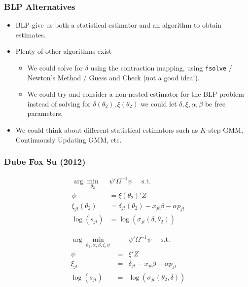 \documentclass[aspectratio=169,10pt]{beamer}
\begin{document}
 \begin{frame}
\frametitle{BLP Alternatives}
\begin{itemize}
 \item BLP give us both a statistical \alert{estimator} and an \alert{algorithm} to obtain estimates.
\item Plenty of other algorithms exist
\begin{itemize}
\item We could solve for $\delta$ using the contraction mapping, using \texttt{fsolve} / Newton's Method / Guess and Check (not a good idea!).
\item We could try and consider a non-nested estimator for the BLP problem instead of solving for $\delta(\theta_2),\xi(\theta_2)$ we could let $\delta,\xi,\alpha,\beta$ be free parameters.
 \end{itemize}
\item We could think about different statistical estimators such as $K$-step GMM, Continuously Updating GMM, etc.
 \end{itemize}
\end{frame}


 \begin{frame}\frametitle{Dube Fox Su (2012)}
\footnotesize
\begin{align}
\label{blpnfxp}
\nonumber \arg \min_{\theta_2} & \psi' \Omega^{-1} \psi \quad \mbox{ s.t. } \\
\nonumber \psi &= \xi(\theta_2)' Z\\
\xi_{jt}(\theta_2) &= \delta_{jt}(\theta_2) - x_{jt} \beta - \alpha p_{jt} \\
\nonumber \log(s_{jt})  &= \log(\sigma_{jt}(\delta,\theta_2))
\end{align}

\begin{eqnarray}
\label{blpmpec}
\nonumber \arg \min_{\theta_2,\alpha,\beta, \xi,\psi} && \psi' \Omega^{-1}  \psi \quad \mbox{ s.t. } \\
 \psi &=& \xi' Z\\
\nonumber \xi_{jt} &=& \delta_{jt} - x_{jt} \beta - \alpha p_{jt} \\
\nonumber \log(s_{jt})  &=& \log(\sigma_{jt}(\theta_2, \delta))
\end{eqnarray}
\end{frame}
\end{document}
